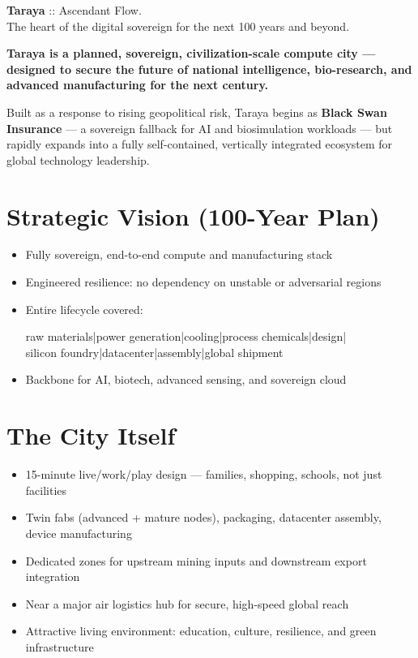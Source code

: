 \documentclass[12pt]{article}
\begin{document}
\begin{center}
    {\huge \textbf{Taraya}} {\Large :: Ascendant Flow.}\\[0.5em]
    {\Large The heart of the digital sovereign for the next 100 years and beyond.}\\[2em]
\end{center}

\begin{spacing}{1.15}

\noindent
\textbf{Taraya is a planned, sovereign, civilization-scale compute city — designed to secure the future of national intelligence, bio-research, and advanced manufacturing for the next century.}

\vspace{1em}
\noindent
Built as a response to rising geopolitical risk, Taraya begins as \textbf{Black Swan Insurance} — a sovereign fallback for AI and biosimulation workloads — but rapidly expands into a fully self-contained, vertically integrated ecosystem for global technology leadership.

\section*{Strategic Vision (100-Year Plan)}
\begin{itemize}
  \item Fully sovereign, end-to-end compute and manufacturing stack
  \item Engineered resilience: no dependency on unstable or adversarial regions
  \item Entire lifecycle covered:
      \begin{center}
        raw materials|power generation|cooling|process chemicals|design| \\
        silicon foundry|datacenter|assembly|global shipment
      \end{center}
  \item Backbone for AI, biotech, advanced sensing, and sovereign cloud
\end{itemize}

\section*{The City Itself}
\begin{itemize}
  \item 15-minute live/work/play design — families, shopping, schools, not just facilities
  \item Twin fabs (advanced + mature nodes), packaging, datacenter assembly, device manufacturing
  \item Dedicated zones for upstream mining inputs and downstream export integration
  \item Near a major air logistics hub for secure, high-speed global reach
  \item Attractive living environment: education, culture, resilience, and green infrastructure
\end{itemize}


\end{spacing}
\end{document}
